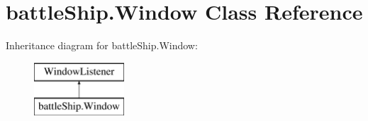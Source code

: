 \hypertarget{classbattleShip_1_1Window}{\section{battle\-Ship.\-Window Class Reference}
\label{classbattleShip_1_1Window}
}
Inheritance diagram for battle\-Ship.\-Window\-:\begin{figure}[H]
\begin{center}
\leavevmode
\includegraphics[height=2.000000cm]{classbattleShip_1_1Window}
\end{center}
\end{figure}
